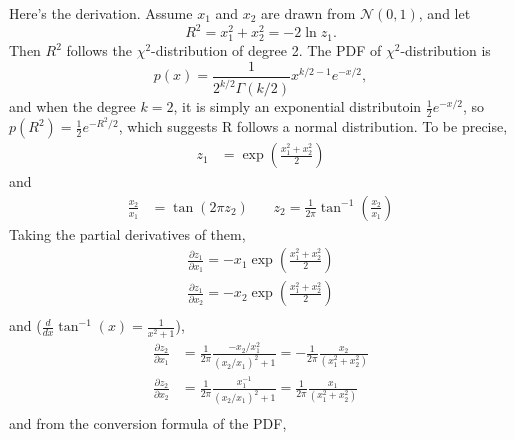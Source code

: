 \documentclass[a4]{article}
\begin{document}
Here's the derivation.
Assume $x_1$ and $x_2$ are drawn from $\mathcal{N}(0,1)$, and let
$$R^2 = x_1^2 + x_2^2 = -2\ln z_1.$$
Then $R^2$ follows the $\chi^2$-distribution of degree 2.
The PDF of $\chi^2$-distribution is 
$$p(x) = \frac{1}{2^{k/2}\Gamma(k/2)}x^{k/2-1}e^{-x/2},$$
and when the degree $k=2$,  it is
simply an exponential distributoin $\frac{1}{2}e^{-x/2}$, so
$p(R^2) = \frac{1}{2}e^{-R^2/2}$, which suggests R follows a normal distribution.
To be precise,
\begin{equation}
\begin{aligned}
z_1 &= \exp(\frac{x_1^2 + x_2^2}{2})
\end{aligned}
\end{equation}
and
\begin{equation}
\begin{aligned}
\frac{x_2}{x_1} &= \tan(2\pi z_2)\:\:\:\:\:\:\:\: z_2 = \frac{1}{2\pi}\tan^{-1}(\frac{x_2}{x_1})
\end{aligned}
\end{equation}
Taking the partial derivatives of them,
\begin{equation}
\begin{aligned}
\frac{\partial z_1}{\partial x_1} = - x_1 \exp(\frac{x_1^2 + x_2^2}{2})\\
\frac{\partial z_1}{\partial x_2} = - x_2 \exp(\frac{x_1^2 + x_2^2}{2})\\
\end{aligned}
\end{equation}
and ($\frac{d}{dx}\tan^{-1}(x) = \frac{1}{x^2 + 1}$),
\begin{equation}
\begin{aligned}
\frac{\partial z_2}{\partial x_1} &= \frac{1}{2\pi}\frac{-x_2/x_1^2}{(x_2/x_1)^2+1}
= - \frac{1}{2\pi}\frac{x_2}{(x_1^2+x_2^2)}\\
\frac{\partial z_2}{\partial x_2} &= \frac{1}{2\pi}\frac{x_1^{-1}}{(x_2/x_1)^2+1}
= \frac{1}{2\pi}\frac{x_1}{(x_1^2+x_2^2)}\\
\end{aligned}
\end{equation}
and from the conversion formula of the PDF,
\end{document}
